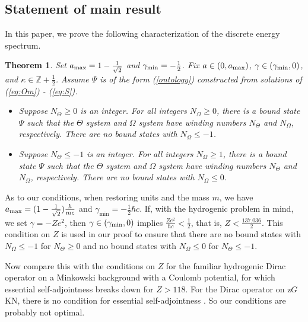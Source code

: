 \documentclass[11 pt]{article}
\newtheorem{thm}{Theorem}[section]
\renewcommand\({\left(}
\renewcommand\){\right)}
\newcommand\<{\langle}
\renewcommand\>{\rangle}
\newcommand\8{\infty}
\newcommand{\Z}{\mathbb{Z}}
\newcommand{\half}{\frac{1}{2}}
\begin{document}
\subsection{Statement of main result}

 In this paper, we prove the following characterization of the discrete energy spectrum.

\medskip
\medskip

\begin{thm}\label{main thm}\:
Set $a_{\rm{max}} = 1 - \frac{1}{\sqrt{2}}$ and $\gamma_{\rm{min}} = -\half$. Fix $a \in (0, a_{\rm{max}})$, $\gamma \in (\gamma_{\rm{min}}, 0)$, and $\kappa \in \Z +\half$. Assume $\Psi$ is of the form \emph{(\ref{ontology})} constructed from solutions of \emph{(\ref{eq:Om})} - \emph{(\ref{eq:S})}.

\begin{itemize}
\item[$\bullet$] Suppose $N_\Theta \geq 0$ is an integer. For all integers $N_\Omega \geq 0$, there is a bound state $\Psi$ such that the $\Theta$ system and $\Omega$ system have winding numbers $N_\Theta$ and $N_\Omega$, respectively. There are no bound states with $N_\Omega \leq - 1$. 

\item[$\bullet$] Suppose $N_\Theta \leq -1$ is an integer. For all integers $N_\Omega \geq 1$, there is a bound state $\Psi$ such that the $\Theta$ system and $\Omega$ system have winding numbers $N_\Theta$ and $N_\Omega$, respectively. There are no bound states with $N_\Omega \leq 0$.
\end{itemize}
\end{thm}

\medskip
\medskip

As to our conditions, 
when restoring units and the mass $m$, we have $a_{\rm{max}} = (1 - \frac{1}{\sqrt{2}})\frac{\hbar}{mc}$ and $\gamma_{\text{min}} = -\half \hbar c.$ 
 If, with the hydrogenic problem in mind, we set  
 $\gamma = -Ze^2$, then $\gamma \in (\gamma_{\rm min}, 0)$ implies $\frac{Ze^2}{\hbar c} < \frac{1}{2}$, that is, $Z < \frac{137.036}{2}$. This condition on $Z$ is used in our proof to ensure that there are no bound states with $N_\Omega \leq -1$ for $N_\Theta \geq 0$ and no bound states with $N_\Omega \leq 0$ 
 for $N_\Theta \leq -1$. 
 
Now compare this with the conditions on $Z$ for the familiar hydrogenic Dirac operator on a Minkowski background with a Coulomb potential, for which
essential self-adjointness breaks down for $Z > 118$. For the Dirac operator on z$G$KN, there is no condition for essential self-adjointness \cite{KTZzGKNDa}.
So our  conditions are probably not optimal. 
\end{document}
